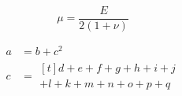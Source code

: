 \documentclass{article}
\begin{document}
\begin{equation}\label{eq:elas:C}
\end{equation}

\begin{equation}
  \mu     = \frac{E    }{2(1+\nu)        }
\end{equation}

\begin{align}
  a & = b + c^2 \\
  c & =
      \begin{multlined}[t]
        d + e + f + g + h + i + j \\
        + l + k + m + n + o + p + q
      \end{multlined}
\end{align}
\end{document}
